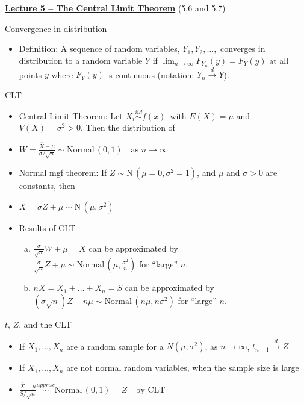 \documentclass{article}
\newcommand{\bu}[1]{\textbf{\ul{#1}}}				%
\newcommand{\follow}[1]{\sim \text{#1}\,}		%
\newcommand{\followsp}[2]{\overset{#1}\sim \text{#2}\,}		%
\newcommand{\vecn}[2]{#1_1, \ldots, #1_{#2}}	%
\begin{document}
{\large \bu{Lecture 5 -- The Central Limit Theorem}} (5.6 and 5.7)\bigskip

Convergence in distribution
\begin{itemize}
    \item Definition: A sequence of random variables, $Y_1, Y_2, \dots,$ converges in distribution to a random variable $Y$ if $\lim_{n \to \infty} F_{Y_n}(y) = F_Y(y)$ at all points $y$ where $F_Y(y)$ is continuous (notation: $Y_n \overset{d}{\to} Y$).
\end{itemize}\bigskip
        
CLT
\begin{itemize}
    \item[] Central Limit Theorem: Let $X_i \followsp{iid}{$f(x)$}$ with $E(X) = \mu$ and $V(X) = \sigma^2 > 0$. Then the distribution of
    \item[] $\displaystyle W = \frac{\bar{X} - \mu}{\sigma / \sqrt{n}} \follow{Normal}(0,1) \quad \text{as } n \to \infty$
    \item Normal mgf theorem: If $Z \follow{N}(\mu = 0, \sigma^2 = 1)$, and $\mu$ and $\sigma > 0$ are constants, then
    \item[] $X = \sigma Z + \mu \follow{N}(\mu, \sigma^2)$
    \item Results of CLT
    \begin{enumerate}[(a)]
        \item $\displaystyle \frac{\sigma}{\sqrt{n}} W + \mu = \bar{X}$ can be approximated by \\ $\displaystyle \frac{\sigma}{\sqrt{n}} Z + \mu \follow{Normal}(\mu, \frac{\sigma^2}{n})$ for ``large'' $n$.
        \item $n \bar{X} = X_1 + \ldots + X_n = S$ can be approximated by \\ $(\sigma \sqrt{n}) Z + n \mu \follow{Normal}(n \mu, n \sigma^2)$ for ``large'' $n$.
    \end{enumerate}        
\end{itemize}\bigskip

$t$, $Z$, and the CLT
\begin{itemize}
    \item If $\vecn{X}{n}$ are a random sample for a $N(\mu, \sigma^2)$, as $n \to \infty$, $t_{n-1} \overset{d} \to Z$
    \item If $\vecn{X}{n}$ are not normal random variables, when the sample size is large
    \item[] $\displaystyle \frac{\bar{X} - \mu}{S / \sqrt{n}} \followsp{approx}{Normal}(0,1) = Z \quad \text{by CLT}$
\end{itemize}\bigskip
\end{document}
